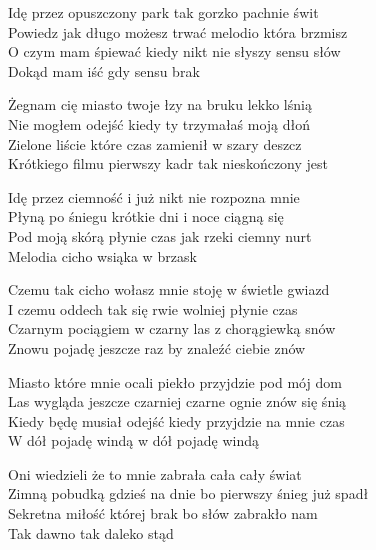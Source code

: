 \begin{text}
    Idę przez opuszczony park tak gorzko pachnie świt\\
    Powiedz jak długo możesz trwać melodio która brzmisz\\
    O czym mam śpiewać kiedy nikt nie słyszy sensu słów\\
    Dokąd mam iść gdy sensu brak

    Żegnam cię miasto twoje łzy na bruku lekko lśnią\\
    Nie mogłem odejść kiedy ty trzymałaś moją dłoń\\
    Zielone liście które czas zamienił w szary deszcz\\
    Krótkiego filmu pierwszy kadr tak nieskończony jest

    Idę przez ciemność i już nikt nie rozpozna mnie\\
    Płyną po śniegu krótkie dni i noce ciągną się\\
    Pod moją skórą płynie czas jak rzeki ciemny nurt\\
    Melodia cicho wsiąka w brzask

    Czemu tak cicho wołasz mnie stoję w świetle gwiazd\\
    I czemu oddech tak się rwie wolniej płynie czas\\
    Czarnym pociągiem w czarny las z chorągiewką snów\\
    Znowu pojadę jeszcze raz by znaleźć ciebie znów

    Miasto które mnie ocali piekło przyjdzie pod mój dom\\
    Las wygląda jeszcze czarniej czarne ognie znów się śnią\\
    Kiedy będę musiał odejść kiedy przyjdzie na mnie czas\\
    W dół pojadę windą w dół pojadę windą

    Oni wiedzieli że to mnie zabrała cała cały świat\\
    Zimną pobudką gdzieś na dnie bo pierwszy śnieg już spadł\\
    Sekretna miłość której brak bo słów zabrakło nam\\
    Tak dawno tak daleko stąd
\end{text}
\begin{chord}

\end{chord}